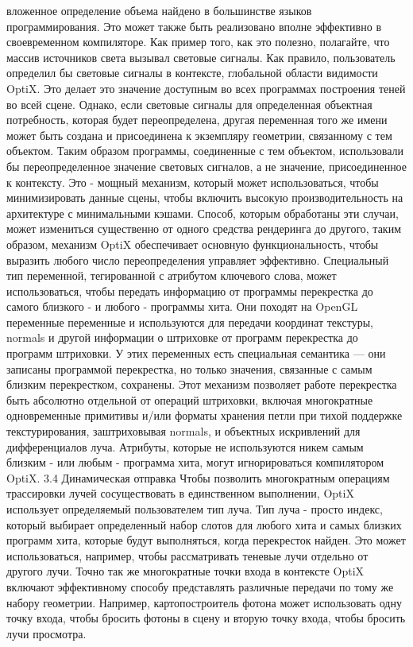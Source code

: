 вложенное определение объема найдено в большинстве языков программирования. Это может также быть реализовано вполне эффективно в своевременном компиляторе. Как пример того, как это полезно, полагайте, что массив источников света вызывал световые сигналы. Как правило, пользователь определил бы световые сигналы в контексте, глобальной области видимости OptiX. Это делает это значение доступным
во всех программах построения теней во всей сцене. Однако, если световые сигналы для
определенная объектная потребность, которая будет переопределена, другая переменная того же имени может быть создана и присоединена к экземпляру геометрии, связанному с тем объектом. Таким образом программы, соединенные с тем объектом, использовали бы переопределенное значение световых сигналов, а не значение, присоединенное к контексту. Это - мощный механизм, который может использоваться, чтобы минимизировать данные сцены, чтобы включить высокую производительность на архитектуре с минимальными кэшами. Способ, которым обработаны эти случаи, может измениться существенно от одного средства рендеринга до другого, таким образом, механизм OptiX обеспечивает основную функциональность, чтобы выразить любого
число переопределения управляет эффективно.
Специальный тип переменной, тегированной с атрибутом ключевого слова, может использоваться, чтобы передать информацию от программы перекрестка до самого близкого - и любого - программы хита. Они походят на OpenGL переменные переменные и используются для передачи координат текстуры, normals и другой информации о штриховке от программ перекрестка до программ штриховки. У этих переменных есть специальная семантика — они записаны программой перекрестка, но только значения, связанные с самым близким перекрестком, сохранены. Этот механизм позволяет работе перекрестка быть абсолютно отдельной от операций штриховки, включая многократные одновременные примитивы и/или форматы хранения петли при тихой поддержке текстурирования, заштриховывая normals, и объектных искривлений для дифференциалов луча. Атрибуты, которые не используются никем самым близким - или любым - программа хита, могут игнорироваться компилятором OptiX.
3.4 Динамическая отправка
Чтобы позволить многократным операциям трассировки лучей сосуществовать в единственном выполнении, OptiX использует определяемый пользователем тип луча. Тип луча - просто индекс, который выбирает определенный набор слотов для любого хита и самых близких программ хита, которые будут выполняться, когда перекресток найден. Это может использоваться, например, чтобы рассматривать теневые лучи отдельно от другого
лучи. Точно так же многократные точки входа в контексте OptiX включают эффективному способу представлять различные передачи по тому же набору геометрии. Например, картопостроитель фотона может использовать одну точку входа, чтобы бросить фотоны в сцену и вторую точку входа, чтобы бросить лучи просмотра.
